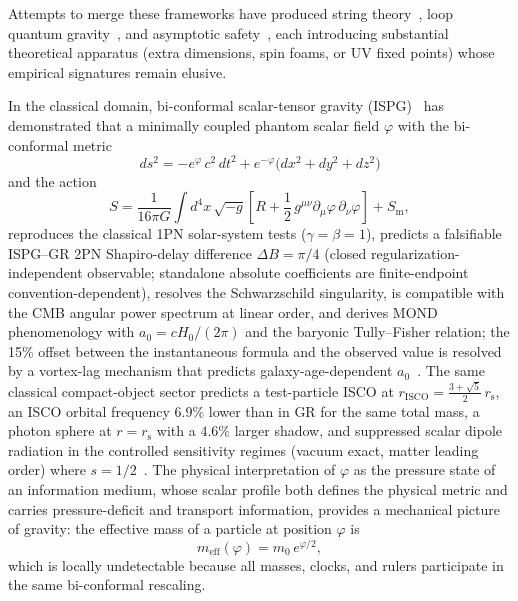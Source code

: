 \documentclass[aps,prd,onecolumn,superscriptaddress,nofootinbib,showpacs,12pt,notitlepage]{revtex4-2}
\newcommand{\rs}{r_{\mathrm{s}}}
\newcommand{\meff}{m_{\mathrm{eff}}}
\begin{document}
Attempts to merge these frameworks have produced string
theory~\cite{Polchinski1998}, loop quantum gravity~\cite{Rovelli2004},
and asymptotic safety~\cite{Reuter2012}, each introducing substantial
theoretical apparatus (extra dimensions, spin foams, or UV fixed points)
whose empirical signatures remain elusive.

In the classical domain, bi-conformal scalar-tensor gravity
(ISPG)~\cite{Lotishvili2026} has demonstrated that a minimally
coupled phantom scalar field $\varphi$ with the bi-conformal metric
\begin{equation}\label{eq:metric}
  ds^{2} = -e^{\varphi}\,c^{2}\,dt^{2}
         + e^{-\varphi}\bigl(dx^{2}+dy^{2}+dz^{2}\bigr)
\end{equation}
and the action
\begin{equation}\label{eq:action}
  S = \frac{1}{16\pi G}\int d^{4}x\,\sqrt{-g}\left[
    R + \frac{1}{2}\,g^{\mu\nu}\partial_{\mu}\varphi\,
    \partial_{\nu}\varphi\right] + S_{\mathrm{m}},
\end{equation}
reproduces the classical 1PN solar-system tests
($\gamma = \beta = 1$), predicts a falsifiable ISPG--GR
2PN Shapiro-delay difference $\Delta B = \pi/4$ (closed
regularization-independent observable; standalone absolute
coefficients are finite-endpoint convention-dependent), resolves the Schwarzschild
singularity, is compatible with the CMB angular power spectrum at
linear order, and derives MOND phenomenology with
$a_0 = cH_0/(2\pi)$ and the baryonic Tully--Fisher relation;
the 15\% offset between the instantaneous formula and the
observed value is resolved by a vortex-lag mechanism that
predicts galaxy-age-dependent
$a_0$~\cite{Lotishvili2026MOND}.
The same classical compact-object sector predicts a test-particle
ISCO at $r_{\mathrm{ISCO}} = \frac{3+\sqrt{5}}{2}\,\rs$, an
ISCO orbital frequency $6.9\%$ lower than in GR for the same
total mass, a photon sphere at $r=\rs$ with a $4.6\%$ larger
shadow, and suppressed scalar dipole radiation in the
controlled sensitivity regimes (vacuum exact, matter leading
order) where $s=1/2$~\cite{Lotishvili2026}.
The physical interpretation of $\varphi$ as the pressure state of an
information medium, whose scalar profile both defines the physical
metric and carries pressure-deficit and transport information, provides
a mechanical picture of gravity:
the effective mass of a particle at position $\varphi$ is
\begin{equation}\label{eq:meff}
  \meff(\varphi) = m_0\,e^{\varphi/2},
\end{equation}
which is locally undetectable because all masses, clocks, and
rulers participate in the same bi-conformal rescaling.
\end{document}
